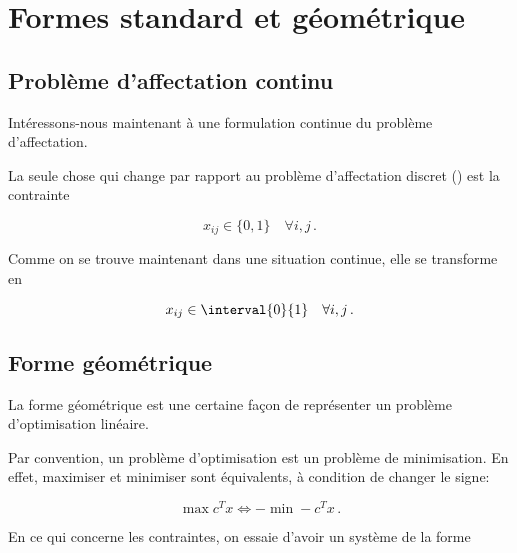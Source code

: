 \section{Formes standard et géométrique}

\subsection{Problème d'affectation continu}

	Intéressons-nous maintenant
	à une formulation continue du problème d'affectation.

	La seule chose qui change
	par rapport au problème d'affectation discret ()
	est la contrainte

	\[
	x_{ij} \in \{0, 1\} \quad \forall i,j\,.
	\]

	Comme on se trouve maintenant dans une situation continue,
	elle se transforme en

	\[
	x_{ij} \in \interval{0}{1} \quad \forall i,j\,.
	\]

\subsection{Forme géométrique}

	La forme géométrique est une certaine façon
	de représenter un problème d'optimisation linéaire.


	Par convention, un problème d'optimisation
	est un problème de minimisation.
	En effet, maximiser et minimiser sont équivalents,
	à condition de changer le signe:

	\[
	\max c^T x \iff -\min -c^T x\,.
	\]

	En ce qui concerne les contraintes,
	on essaie d'avoir un système de la forme

